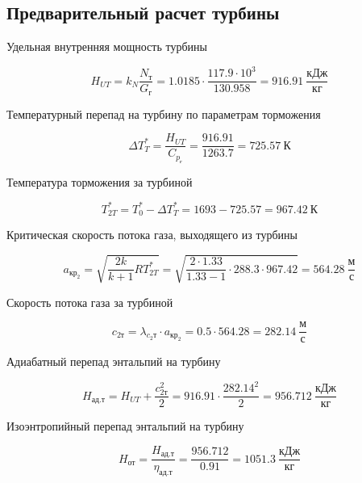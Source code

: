 \subsection{Предварительный расчет турбины}

Удельная внутренняя мощность турбины

\begin{equation} \label{eu_eqn}
		H_{UT}=k_{N} \dfrac{N_{\text{т}}}{G_{\text{г}}}= 1.0185\cdot \dfrac{117.9\cdot 10^3}{130.958} =916.91 \ \dfrac{\text{кДж}}{\text{кг}}
	\end{equation}

Температурный перепад на турбину по параметрам торможения

\begin{equation} \label{eu_eqn}
		\Delta T_{T}^*= \dfrac{H_{UT}}{C_{p_{\text{г}}}}= \dfrac{916.91}{1263.7}=725.57 \ \text{К}
	\end{equation}

Температура торможения за турбиной

\begin{equation} \label{eu_eqn}
		T_{2T}^*=T_{0}^*-\Delta T_{T}^*=1693-725.57=967.42 \ \text{К}
	\end{equation}

Критическая скорость потока газа, выходящего из турбины

\begin{equation} \label{eu_eqn}
		a_{\text{кр}_{2}}=\sqrt{ \dfrac{2k}{k+1} RT_{2T}^*}=\sqrt{ \dfrac{2\cdot 1.33}{1.33-1} \cdot 288.3\cdot 967.42}=564.28 \ \dfrac{\text{м}}{\text{с}}
\end{equation}

Скорость потока газа за турбиной

\begin{equation} \label{eu_eqn}
		c_{2{\text{т}}}=\lambda_{c_{2} \text{т}}\cdot a_{\text{кр}_{2}}=0.5\cdot 564.28 = 282.14 \ \dfrac{\text{м}}{\text{с}}
\end{equation}

Адиабатный перепад энтальпий на турбину

\begin{equation} \label{eu_eqn}
		H_{\text{ад.т}}= H_{UT}+ \dfrac{c_{2\text{т}}^2}{2}=916.91 \cdot \dfrac{282.14^2}{2}=956.712 \ \dfrac{\text{кДж}}{\text{кг}}
\end{equation}

Изоэнтропийный перепад энтальпий на турбину

\begin{equation} \label{eu_eqn}
		H_{\text{от}}=\dfrac{H_{\text{ад.т}}}{\eta_{\text{ад.т}}}=\dfrac{956.712}{0.91}=1051.3 \ \dfrac{\text{кДж}}{\text{кг}}
\end{equation}

